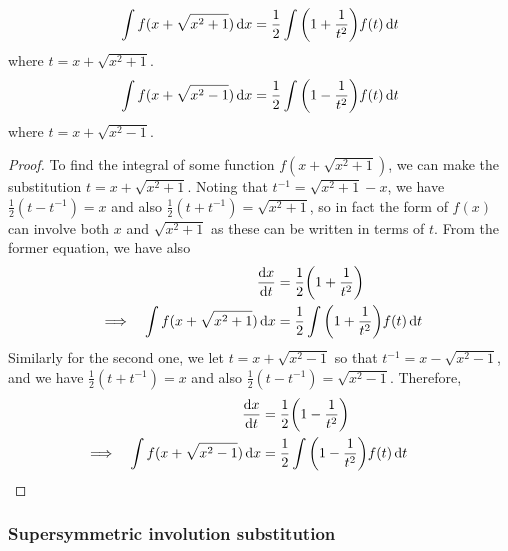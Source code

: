 \begin{theorem}
\begin{equation*}
\int f(x + \sqrt{x^2 + 1}) \dd{x}
    = \frac 12 \int \pqty{1 + \frac 1{t^2}}f(t) \dd{t}
\end{equation*}
where \(t = x + \sqrt{x^2 + 1}\).
\begin{equation*}
\int f(x + \sqrt{x^2 - 1}) \dd{x}
    = \frac 12 \int \pqty{1 - \frac 1{t^2}}f(t) \dd{t}
\end{equation*}
where \(t = x + \sqrt{x^2 - 1}\).
\end{theorem}
\begin{proof}
To find the integral of some function \(f(x + \sqrt{x^2 + 1})\), we can make
the substitution \(t = x + \sqrt{x^2 + 1}\). Noting that
\(t^{-1} = \sqrt{x^2 + 1} - x\), we have \(\frac 12(t - t^{-1}) = x\)
and also \(\frac 12(t + t^{-1}) = \sqrt{x^2 + 1}\), so in fact the form of
\(f(x)\) can involve both \(x\) and \(\sqrt{x^2 + 1}\) as these can be
written in terms of \(t\). From the former equation, we have also
\begin{alignat*}{2}
&& \dv{x}{t} &= \frac 12\pqty{1 + \frac 1{t^2}} \\
&\implies& \int f(x + \sqrt{x^2 + 1}) \dd{x}
    &= \frac 12 \int \pqty{1 + \frac 1{t^2}}f(t) \dd{t}
\end{alignat*}
Similarly for the second one, we let \(t = x + \sqrt{x^2 - 1}\) so that
\(t^{-1} = x - \sqrt{x^2 - 1}\), and we have \(\frac 12(t + t^{-1}) = x\)
and also \(\frac 12(t - t^{-1}) = \sqrt{x^2 - 1}\). Therefore,
\begin{alignat*}{2}
&& \dv{x}{t} &= \frac 12\pqty{1 - \frac 1{t^2}} \\
&\implies& \int f(x + \sqrt{x^2 - 1}) \dd{x}
    &= \frac 12 \int \pqty{1 - \frac 1{t^2}}f(t) \dd{t} \tag*{\qedhere}
\end{alignat*}
\end{proof}

\subsubsection{Supersymmetric involution substitution}

